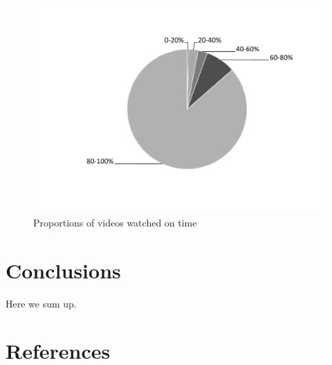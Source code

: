 \documentclass{amsart}
\begin{document}
\begin{center}
\begin{figure}[hbt]
\includegraphics[width=1\textwidth]{figure4.pdf}
\caption{Proportions of videos watched on time}
\end{figure}
\end{center}


\section{Conclusions}
Here we sum up.

\section{References}
\end{document}
